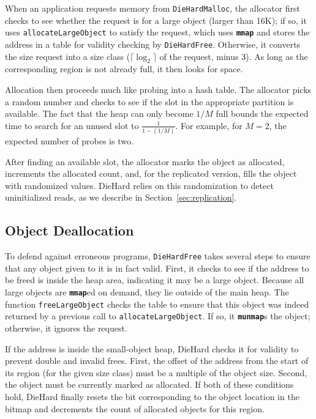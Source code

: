 \documentclass{sig-alternate}
\newcommand{\cfunction}[1]{{\bf \tt #1}}
\newcommand{\mmap}{\cfunction{mmap}}
\newcommand{\munmap}{\cfunction{munmap}}
\begin{document}
\noindent
When an application requests memory from \texttt{DieHardMalloc}, the
allocator first checks to see whether the request is for a large object
(larger than 16K); if so, it uses \texttt{allocateLargeObject} to
satisfy the request, which uses \mmap{} and stores the address in a
table for validity checking by \texttt{DieHardFree}. Otherwise, it
converts the size request into a size class ($\lceil\log_2\rceil$ of the
request, minus 3). As long as the corresponding region is not already full, it
then looks for space.

Allocation then proceeds much like probing into a hash table. The
allocator picks a random number and checks to see if the slot in the
appropriate partition is available. The fact that the heap can only
become $1/M$ full bounds the expected time to search for an unused
slot to $\frac{1}{1-(1/M)}$. For example, for $M = 2$, the expected
number of probes is two.

After finding an available slot, the allocator marks the
object as allocated, increments the allocated count, and, for the
replicated version, fills the object with randomized values. DieHard
relies on this randomization to detect uninitialized reads, as we
describe in Section~\ref{sec:replication}.

\subsection{Object Deallocation}

\noindent
To defend against erroneous programs, \texttt{DieHardFree} takes
several steps to ensure that any object given to it is in fact
valid. First, it checks to see if the address to be freed is inside
the heap area, indicating it may be a large object. Because all large
objects are \mmap{}ed on demand, they lie outside of the main
heap. The function
\texttt{freeLargeObject} checks the table to ensure that this object
was indeed returned by a previous call to
\texttt{allocateLargeObject}. If so, it \munmap{}s the object;
otherwise, it ignores the request.

If the address is inside the small-object heap, DieHard checks it for
validity to prevent double and invalid frees. First, the offset of the
address from the start of its region (for the given size class) must
be a multiple of the object size. Second, the object must be currently
marked as allocated. If both of these conditions hold, DieHard finally
resets the bit corresponding to the object location in the bitmap and
decrements the count of allocated objects for this region.
\end{document}
